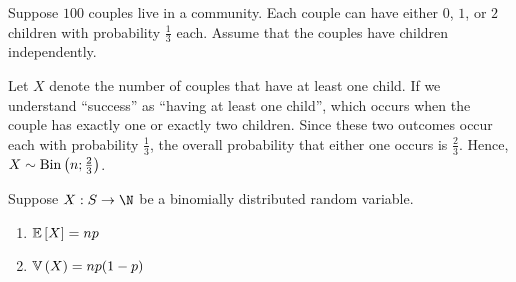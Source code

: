 \documentclass[11pt]{article}
\begin{document}
\begin{eg}
    Suppose $100$ couples live in a community.
    Each couple can have either $0$, $1$, or $2$ children with probability
    $\frac{1}{3}$ each.
    Assume that the couples have children independently.

    Let $X$ denote the number of couples that have at least one child.
    If we understand ``success'' as ``having at least one child'', which occurs
    when the couple has exactly one or exactly two children.
    Since these two outcomes occur each with probability $\frac{1}{3}$, the
    overall probability that either one occurs is $\frac{2}{3}$.
    Hence, $X \sim \operatorname{Bin}\left(n;\frac{2}{3}\right)$.
\end{eg}

\begin{thm}
    \label{thm:e-v-of-binomial-distribution}
    Suppose $X : S \to \N$ be a binomially distributed random variable.
    \begin{enumerate}
        \item $\operatorname{\mathbb{E}}{\left[X\right]} = np$
        \item $\operatorname{\mathbb{V}}{\left(X\right)} = np(1-p)$
    \end{enumerate}
\end{thm}
\end{document}
